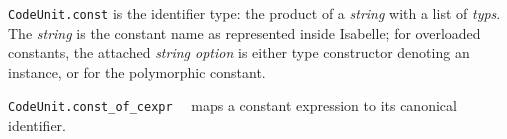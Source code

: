 \begin{isabellebody}
\begin{isamarkuptext}
  \begin{description}

  \item \verb|CodeUnit.const| is the identifier type:
     the product of a \emph{string} with a list of \emph{typs}.
     The \emph{string} is the constant name as represented inside Isabelle;
     for overloaded constants, the attached \emph{string option}
     is either  type constructor denoting an instance,
     or  for the polymorphic constant.

  \item \verb|CodeUnit.const_of_cexpr|~~
     maps a constant expression 
     to its canonical identifier.


\end{description}
\end{isamarkuptext}
\end{isabellebody}
